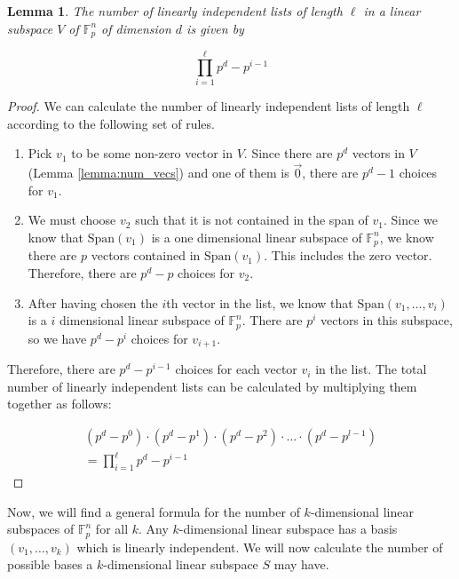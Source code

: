 \documentclass{article}
\newcommand{\F}{\mathbb{F}}
\newtheorem{lemma}[theorem]{Lemma}
\begin{document}
\begin{lemma}
    \label{lemma:num_lists}
    The number of linearly independent lists of length $\ell$ in a linear subspace $V$ of $\F_p^n$ of dimension $d$ is given by

    \[\prod _{i = 1} ^{\ell} p^d - p^{i - 1}\]
\end{lemma}

\begin{proof}
    We can calculate the number of linearly independent lists of length $\ell$ according to the following set of rules.

    \begin{enumerate}
        \item Pick $v_1$ to be some non-zero vector in $V$. Since there are $p^d$ vectors in $V$ (Lemma \ref{lemma:num_vecs}) and one of them is $\vec{0}$, there are $p^d - 1$ choices for $v_1$.
        \item We must choose $v_2$ such that it is not contained in the span of $v_1$. Since we know that $\text{Span}(v_1)$ is a one dimensional linear subspace of $\F_p^n$, we know there are $p$ vectors contained in $\text{Span}(v_1)$. This includes the zero vector. Therefore, there are $p^d - p$ choices for $v_2$.
        \item After having chosen the $i$th vector in the list, we know that $\text{Span}(v_1, \dots, v_i)$ is a $i$ dimensional linear subspace of $\F_p^n$. There are $p^i$ vectors in this subspace, so we have $p^d - p^i$ choices for $v_{i+1}$.
    \end{enumerate}

    Therefore, there are $p^d - p^{i-1}$ choices for each vector $v_i$ in the list. The total number of linearly independent lists can be calculated by multiplying them together as follows:

    \begin{align*}
        (p^d - p^0) \cdot (p^d - p^1) \cdot (p^d - p^2) \cdot \ldots \cdot (p^d - p^{l-1}) \\
        = \prod _{i = 1} ^{\ell} p^d - p^{i - 1}
    \end{align*}
\end{proof}

Now, we will find a general formula for the number of $k$-dimensional linear subspaces of $\F_p^n$ for all $k$. Any $k$-dimensional linear subspace has a basis $(v_1, \dots, v_k)$ which is linearly independent. We will now calculate the number of possible bases a $k$-dimensional linear subspace $S$ may have.
\end{document}
